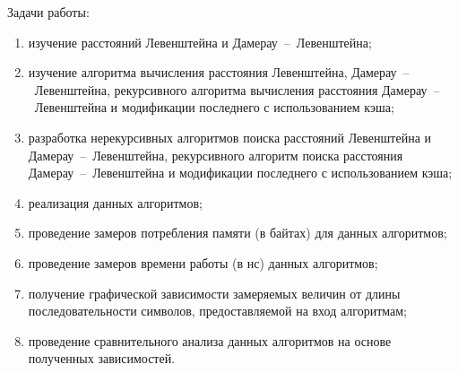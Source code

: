 Задачи работы:
\begin{enumerate}[label={\arabic*)}]
	\item изучение расстояний Левенштейна и Дамерау~--~Левенштейна;
	\item изучение алгоритма вычисления расстояния Левенштейна, Дамерау~--~Левенштейна, рекурсивного алгоритма вычисления расстояния Дамерау~--~Левенштейна и модификации последнего с использованием кэша;
	\item разработка нерекурсивных алгоритмов поиска расстояний Левенштейна и  Дамерау~--~Левенштейна, рекурсивного алгоритм поиска расстояния Дамерау~--~Левенштейна и модификации последнего с использованием кэша;
	\item реализация данных алгоритмов;
	\item проведение замеров потребления памяти (в байтах) для данных алгоритмов; 
	\item проведение замеров времени работы (в нс) данных алгоритмов; 
	\item получение графической зависимости замеряемых величин от длины последовательности символов, предоставляемой на вход алгоритмам;
	\item проведение сравнительного анализа данных алгоритмов на основе полученных зависимостей.
\end{enumerate}

\newpage